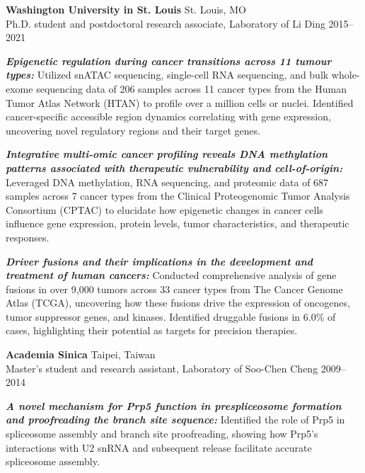 \documentclass[letterpaper,11pt]{cv}
\begin{document}
\begin{entrylist}
    \item \textbf{Washington University in St. Louis} \hfill St. Louis, MO\\
    Ph.D. student and postdoctoral research associate, {Laboratory of Li Ding } \hfill
    2015--2021
    \begin{detaillist}
        \item \textit{\textbf{Epigenetic regulation during cancer transitions across 11 tumour types:}} Utilized snATAC sequencing, single-cell RNA sequencing, and bulk whole-exome sequencing data of 206 samples across 11 cancer types from the Human Tumor Atlas Network (HTAN) to profile over a million cells or nuclei. Identified cancer-specific accessible region dynamics correlating with gene expression, uncovering novel regulatory regions and their target genes.
        \item \textit{\textbf{Integrative multi-omic cancer profiling reveals DNA methylation patterns associated with therapeutic vulnerability and cell-of-origin:}} Leveraged DNA methylation, RNA sequencing, and proteomic data of 687 samples across 7 cancer types from the Clinical Proteogenomic Tumor Analysis Consortium (CPTAC) to elucidate how epigenetic changes in cancer cells influence gene expression, protein levels, tumor characteristics, and therapeutic responses.
        \item \textit{\textbf{Driver fusions and their implications in the development and treatment of human cancers:}} Conducted comprehensive analysis of gene fusions in over 9,000 tumors across 33 cancer types from The Cancer Genome Atlas (TCGA), uncovering how these fusions drive the expression of oncogenes, tumor suppressor genes, and kinases. Identified druggable fusions in 6.0\% of cases, highlighting their potential as targets for precision therapies.
    \end{detaillist}
    
    \item \textbf{Academia Sinica} \hfill Taipei, Taiwan\\
    Master's student and research assistant, Laboratory of Soo-Chen Cheng \hfill
    2009--2014
    \begin{detaillist}
        \item \textit{\textbf{A novel mechanism for Prp5 function in prespliceosome formation and proofreading the branch site sequence: }}Identified the role of Prp5 in spliceosome assembly and branch site proofreading, showing how Prp5's interactions with U2 snRNA and subsequent release facilitate accurate spliceosome assembly.
    \end{detaillist}
    

\end{entrylist}
\end{document}
